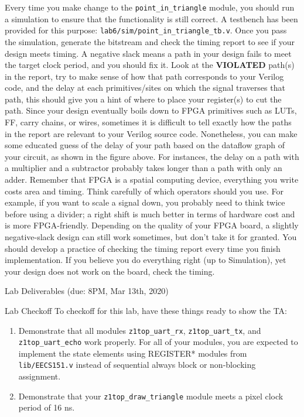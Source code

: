 \documentclass[11pt]{article}
\makeatletter
\renewcommand{\section}
{\@startsection {section}{1}{0pt}
 {-2ex}
 {1ex}
 {\bfseries\Large}}
\renewcommand{\subsection}
{\@startsection {subsection}{1}{0pt}
 {-1ex}
 {0.5ex}
 {\bfseries\normalsize}}
\makeatother
\begin{document}
Every time you make change to the \verb|point_in_triangle| module, you should run a simulation to ensure that the functionality is still correct. A testbench has been provided for this purpose: \verb|lab6/sim/point_in_triangle_tb.v|. Once you pass the simulation, generate the bitstream and check the timing report to see if your design meets timing. A negative slack means a path in your design fails to meet the target clock period, and you should fix it. Look at the \textbf{VIOLATED} path(s) in the report, try to make sense of how that path corresponds to your Verilog code, and the delay at each primitives/sites on which the signal traverses that path, this should give you a hint of where to place your register(s) to cut the path. Since your design eventually boils down to FPGA primitives such as LUTs, FF, carry chains, or wires, sometimes it is difficult to tell exactly how the paths in the report are relevant to your Verilog source code. Nonetheless, you can make some educated guess of the delay of your path based on the dataflow graph of your circuit, as shown in the figure above. For instances, the delay on a path with a multiplier and a subtractor probably takes longer than a path with only an adder. Remember that FPGA is a spatial computing device, everything you write costs area and timing. Think carefully of which operators should you use. For example, if you want to scale a signal down, you probably need to think twice before using a divider; a right shift is much better in terms of hardware cost and is more FPGA-friendly. Depending on the quality of your FPGA board, a slightly negative-slack design can still work sometimes, but don't take it for granted. You should develop a practice of checking the timing report every time you finish implementation. If you believe you do everything right (up to Simulation), yet your design does not work on the board, check the timing.

\section{Lab Deliverables (due: 8PM, Mar 13th, 2020)}
\subsection{Lab Checkoff}
To checkoff for this lab, have these things ready to show the TA:
\begin{enumerate}
  \item Demonstrate that all modules \verb|z1top_uart_rx|, \verb|z1top_uart_tx|, and \verb|z1top_uart_echo| work properly. For all of your modules, you are expected to implement the state elements using REGISTER* modules from \verb|lib/EECS151.v| instead of sequential always block or non-blocking assignment.
  \item Demonstrate that your \verb|z1top_draw_triangle| module meets a pixel clock period of 16 ns.

\end{enumerate}
\end{document}
